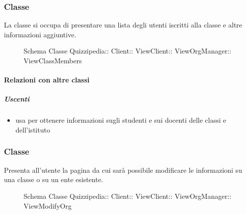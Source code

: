 \subsubsection{Classe }
La classe si occupa di presentare una lista degli utenti iscritti alla classe e altre informazioni aggiuntive.
\begin{figure}[H]
\centering
\noindent{}
\caption[Schema Classe ViewClassMembers]{Schema Classe Quizzipedia:: Client:: ViewClient:: ViewOrgManager:: ViewClassMembers}
\end{figure}
\paragraph{Relazioni con altre classi}
\subparagraph{Uscenti}
\begin{itemize}
\item usa  per ottenere informazioni sugli studenti e sui docenti delle classi e dell'istituto
\end{itemize}
\subsubsection{Classe }
Presenta all'utente la pagina da cui sarà possibile modificare le informazioni su una classe o su un ente esistente.
\begin{figure}[H]
\centering
\noindent{}
\caption[Schema Classe ViewModifyOrg]{Schema Classe Quizzipedia:: Client:: ViewClient:: ViewOrgManager:: ViewModifyOrg}
\end{figure}
